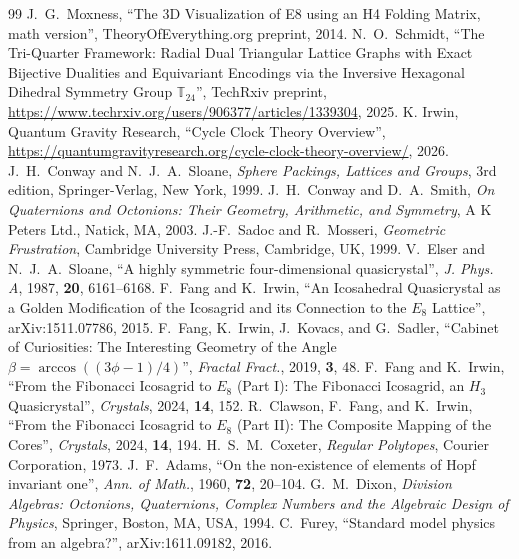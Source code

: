 \documentclass{article}
\begin{document}
\begin{thebibliography}{99}
J.~G.~Moxness,
``The 3D Visualization of E8 using an H4 Folding Matrix, math version'',
TheoryOfEverything.org preprint, 2014.
N.~O.~Schmidt,
``The Tri-Quarter Framework: Radial Dual Triangular Lattice Graphs with Exact Bijective Dualities and Equivariant Encodings via the Inversive Hexagonal Dihedral Symmetry Group \(\mathbb{T}_{24}\)'',
TechRxiv preprint, \url{https://www.techrxiv.org/users/906377/articles/1339304}, 2025.
K. Irwin, Quantum Gravity Research,
``Cycle Clock Theory Overview'',
\url{https://quantumgravityresearch.org/cycle-clock-theory-overview/}, 2026.
J.~H.~Conway and N.~J.~A.~Sloane,
\emph{Sphere Packings, Lattices and Groups},
3rd edition, Springer-Verlag, New York, 1999.
J.~H.~Conway and D.~A.~Smith,
\emph{On Quaternions and Octonions: Their Geometry, Arithmetic, and Symmetry},
A K Peters Ltd., Natick, MA, 2003.
J.-F.~Sadoc and R.~Mosseri,
\emph{Geometric Frustration},
Cambridge University Press, Cambridge, UK, 1999.
V.~Elser and N.~J.~A.~Sloane,
``A highly symmetric four-dimensional quasicrystal'',
\emph{J. Phys. A}, 1987, \textbf{20}, 6161--6168.
F.~Fang and K.~Irwin,
``An Icosahedral Quasicrystal as a Golden Modification of the Icosagrid and its Connection to the $E_8$ Lattice'',
arXiv:1511.07786, 2015.
F.~Fang, K.~Irwin, J.~Kovacs, and G.~Sadler,
``Cabinet of Curiosities: The Interesting Geometry of the Angle $\beta=\arccos((3\phi-1)/4)$'',
\emph{Fractal Fract.}, 2019, \textbf{3}, 48.
F.~Fang and K.~Irwin,
``From the Fibonacci Icosagrid to $E_8$ (Part I): The Fibonacci Icosagrid, an $H_3$ Quasicrystal'',
\emph{Crystals}, 2024, \textbf{14}, 152.
R.~Clawson, F.~Fang, and K.~Irwin,
``From the Fibonacci Icosagrid to $E_8$ (Part II): The Composite Mapping of the Cores'',
\emph{Crystals}, 2024, \textbf{14}, 194.
H.~S.~M.~Coxeter,
\emph{Regular Polytopes},
Courier Corporation, 1973.
J.~F.~Adams,
``On the non-existence of elements of Hopf invariant one'',
\emph{Ann. of Math.}, 1960, \textbf{72}, 20--104.
G.~M.~Dixon,
\emph{Division Algebras: Octonions, Quaternions, Complex Numbers and the Algebraic Design of Physics},
Springer, Boston, MA, USA, 1994.
C.~Furey,
``Standard model physics from an algebra?'',
arXiv:1611.09182, 2016.
\end{thebibliography}
\end{document}
